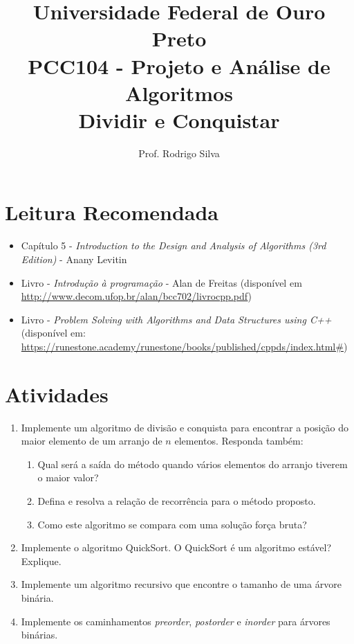 \documentclass{article}
\title{\vspace{-2 cm}Universidade Federal de Ouro Preto \\ PCC104 - Projeto e Análise de Algoritmos \\ Dividir e Conquistar}
\author{Prof. Rodrigo Silva}
\begin{document}
\maketitle

\section{Leitura Recomendada}

\begin{itemize}
    \item Capítulo 5 - \textit{Introduction to the Design and Analysis of Algorithms (3rd Edition)} - Anany Levitin 
    \item Livro - \textit{Introdução à programação} - Alan de Freitas (disponível em \url{http://www.decom.ufop.br/alan/bcc702/livrocpp.pdf})
    \item Livro - \textit{Problem Solving with Algorithms and Data Structures using C++} (disponível em: \url{https://runestone.academy/runestone/books/published/cppds/index.html#})
\end{itemize}


\section{Atividades}

\begin{enumerate}
    \item Implemente um algoritmo de divisão e conquista para encontrar a posição do maior elemento de um arranjo de $n$ elementos. Responda também: %
    \begin{enumerate} 
        \item Qual será a saída do método quando vários elementos do arranjo tiverem o maior valor?
        \item Defina e resolva a relação de recorrência para o método proposto.
        \item Como este algoritmo se compara com uma solução força bruta?
    \end{enumerate}
    \item Implemente o algoritmo QuickSort. O QuickSort é um algoritmo estável? Explique.
    \item Implemente um algoritmo recursivo que encontre o tamanho de uma árvore binária.
    \item Implemente os caminhamentos \textit{preorder}, \textit{postorder} e \textit{inorder} para árvores binárias.
     
\end{enumerate}
\end{document}
